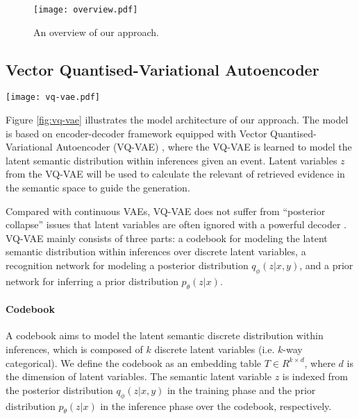 \documentclass[11pt,a4paper]{article}
\begin{document}
\begin{figure}[t]
	\centering
	\texttt{[image: overview.pdf]}
	\caption{An overview of our approach.}
	\label{fig:model}
\end{figure}










\subsection{Vector Quantised-Variational Autoencoder}
\begin{figure*}[t]
	\centering
	\texttt{[image: vq-vae.pdf]}
	\caption{The model architecture of our approach. }
	\label{fig:vq-vae}
\end{figure*}

Figure \ref{fig:vq-vae} illustrates the model architecture of our approach. The model is based on encoder-decoder framework equipped with Vector Quantised-Variational Autoencoder (VQ-VAE) \cite{van2017neural}, where the VQ-VAE is learned to model the latent semantic distribution within inferences given an event. Latent variables $z$ from the VQ-VAE will be used to calculate the \mbox{relevant} of retrieved evidence in the semantic space to guide the generation.



Compared with continuous VAEs, VQ-VAE does not suffer from ``posterior collapse'' issues that latent variables are often ignored with a powerful decoder \cite{van2017neural}.
VQ-VAE mainly consists of three parts: a codebook for modeling the latent semantic distribution within inferences over discrete latent variables, a recognition network for modeling a posterior distribution $q_\phi(z|x,y)$, and a prior network for inferring a prior distribution $p_\theta(z|x)$. 


\paragraph{Codebook}
A codebook aims to model the \mbox{latent} semantic discrete distribution within inferences, which is composed of $k$ discrete latent variables (i.e. $k$-way  categorical). We define the codebook as an embedding table $T\in{R^{k\times d}}$, where $d$ is the dimension of latent variables. The semantic latent variable $z$ is indexed from the posterior distribution $q_\phi(z|x,y)$ in the training phase and the prior distribution $p_\theta(z|x)$ in the inference phase over the codebook, respectively. 
\end{document}
